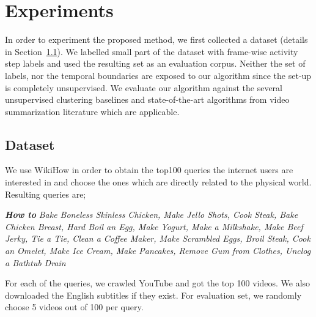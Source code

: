 \section{Experiments}
In order to experiment the proposed method, we first collected a dataset (details in Section~\ref{dataset:sec}). We labelled small part of the dataset with frame-wise activity step labels and used the resulting set as an evaluation corpus. Neither the set of labels, nor the temporal boundaries are exposed to our algorithm since the set-up is completely unsupervised. We evaluate our algorithm against the several unsupervised clustering baselines and state-of-the-art algorithms from video summarization literature which are applicable.
\subsection{Dataset}
\label{dataset:sec}
We use WikiHow\cite{wikiHow} in order to obtain the top100 queries the internet users are interested in and choose the ones which are
directly related to the physical world. Resulting queries are;

\emph{\textbf{How to}}\footnotesize
\emph{Bake Boneless Skinless Chicken, Make Jello Shots, Cook Steak, Bake Chicken Breast, Hard Boil an Egg, Make Yogurt, Make a Milkshake, Make Beef Jerky, Tie a Tie, Clean a Coffee Maker, Make Scrambled Eggs, Broil Steak, Cook an Omelet, Make Ice Cream, Make Pancakes, Remove Gum from Clothes, Unclog a Bathtub Drain}
\normalsize

For each of the queries, we crawled YouTube and got the top 100 videos. We also downloaded the English subtitles if they exist. For evaluation set, we randomly choose 5 videos out of 100 per query.

\vspace{-1mm}
